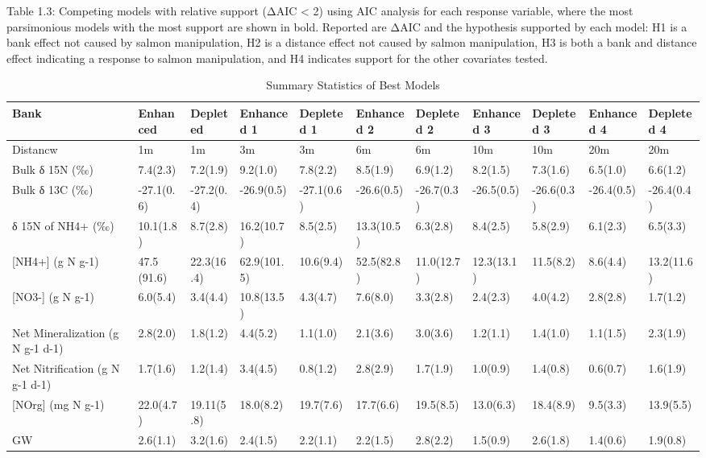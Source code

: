 \documentclass [11pt, proquest] {uwthesis}[2015/03/03]
\begin{document}
\endgroup{} \clearpage
\begin{landscape}

Table 1.3: Competing models with relative support (ΔAIC < 2) using AIC analysis for each response variable, where the most parsimonious models with the most support are shown in bold. Reported are ΔAIC and the hypothesis supported by each model: H1 is a bank effect not caused by salmon manipulation, H2 is a distance effect not caused by salmon manipulation, H3 is both a bank and distance effect indicating a response to salmon manipulation, and H4 indicates support for the other covariates tested. 
\begingroup\fontsize{8}{10}\selectfont
\begin{longtable}[t]{lllllllllll}
\caption{\label{tab:suppsumm}Summary Statistics of Best Models}\\
\toprule
Bank & Enhanced & Depleted & Enhanced 1 & Depleted 1 & Enhanced 2 & Depleted 2 & Enhanced 3 & Depleted 3 & Enhanced 4 & Depleted 4\\
\midrule
Distancw & 1m & 1m & 3m & 3m & 6m & 6m & 10m & 10m & 20m & 20m\\
Bulk δ 15N (‰) & 7.4(2.3) & 7.2(1.9) & 9.2(1.0) & 7.8(2.2) & 8.5(1.9) & 6.9(1.2) & 8.2(1.5) & 7.3(1.6) & 6.5(1.0) & 6.6(1.2)\\
Bulk δ 13C (‰) & -27.1(0.6) & -27.2(0.4) & -26.9(0.5) & -27.1(0.6) & -26.6(0.5) & -26.7(0.3) & -26.5(0.5) & -26.6(0.3) & -26.4(0.5) & -26.4(0.4)\\
δ 15N of NH4+ (‰) & 10.1(1.8) & 8.7(2.8) & 16.2(10.7) & 8.5(2.5) & 13.3(10.5) & 6.3(2.8) & 8.4(2.5) & 5.8(2.9) & 6.1(2.3) & 6.5(3.3)\\
{}[NH4+] (g N g-1) & 47.5 (91.6) & 22.3(16.4) & 62.9(101.5) & 10.6(9.4) & 52.5(82.8) & 11.0(12.7) & 12.3(13.1) & 11.5(8.2) & 8.6(4.4) & 13.2(11.6)\\
\addlinespace
{}[NO3-] (g N g-1) & 6.0(5.4) & 3.4(4.4) & 10.8(13.5) & 4.3(4.7) & 7.6(8.0) & 3.3(2.8) & 2.4(2.3) & 4.0(4.2) & 2.8(2.8) & 1.7(1.2)\\
Net Mineralization (g N g-1 d-1) & 2.8(2.0) & 1.8(1.2) & 4.4(5.2) & 1.1(1.0) & 2.1(3.6) & 3.0(3.6) & 1.2(1.1) & 1.4(1.0) & 1.1(1.5) & 2.3(1.9)\\
Net Nitrification (g N g-1 d-1) & 1.7(1.6) & 1.2(1.4) & 3.4(4.5) & 0.8(1.2) & 2.8(2.9) & 1.7(1.9) & 1.0(0.9) & 1.4(0.8) & 0.6(0.7) & 1.6(1.9)\\
{}[NOrg] (mg N g-1) & 22.0(4.7) & 19.11(5.8) & 18.0(8.2) & 19.7(7.6) & 17.7(6.6) & 19.5(8.5) & 13.0(6.3) & 18.4(8.9) & 9.5(3.3) & 13.9(5.5)\\
GW & 2.6(1.1) & 3.2(1.6) & 2.4(1.5) & 2.2(1.1) & 2.2(1.5) & 2.8(2.2) & 1.5(0.9) & 2.6(1.8) & 1.4(0.6) & 1.9(0.8)\\

\end{longtable}
\end{landscape}
\end{document}
